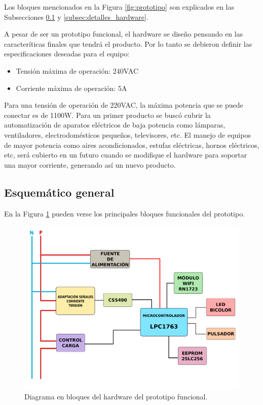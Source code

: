 Los bloques mencionados en la Figura \ref{fig:prototipo} son explicados en las Subsecciones \ref{subsec:esquematico_general} y \ref{subsec:detalles_hardware}.

A pesar de ser un prototipo funcional, el hardware se diseño pensando en las caracteríticas finales que tendrá el producto. Por lo tanto se debieron definir las especificaciones deseadas para el equipo:

\begin{itemize}
\item Tensión máxima de operación: 240VAC
\item Corriente máxima de operación: 5A
\end{itemize}

Para una tensión de operación de 220VAC, la máxima potencia que se puede conectar es de 1100W. Para un primer producto se buscó cubrir la automatización de aparatos eléctricos de baja potencia como lámparas, ventiladores, electrodomésticos pequeños, televisores, etc. El manejo de equipos de mayor potencia como aires acondicionados, estufas eléctricas, hornos eléctricos, etc, será cubierto en un futuro cuando se modifique el hardware para soportar una mayor corriente, generando así un nuevo producto.



\subsection{Esquemático general}
\label{subsec:esquematico_general}

En la Figura \ref{fig:hardware_diagrama_bloques} pueden verse los principales bloques funcionales del prototipo.

\begin{figure}[h]
	\centering
	\includegraphics[width=12cm]{./Figures/3_1_1_diagrama_bloques_hardware.png}
	\caption{Diagrama en bloques del hardware del prototipo funcional.}
	\label{fig:hardware_diagrama_bloques}
\end{figure}

